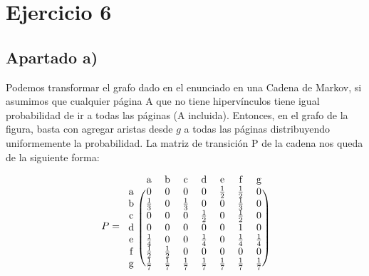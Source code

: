 \documentclass[11pt]{article}
\begin{document}
\section{Ejercicio 6}

\subsection*{Apartado a)}

Podemos transformar el grafo dado en el enunciado en una Cadena de Markov,
si asumimos que cualquier página A que no tiene hipervínculos tiene igual 
probabilidad de ir a todas las páginas (A incluida). Entonces, en el grafo
de la figura, basta con agregar aristas desde $g$ a todas las páginas
distribuyendo uniformemente la probabilidad. 
La matriz de transición P de la cadena nos queda de la siguiente forma:

\begin{equation*}
  P = 
  \begin{blockarray}{cccccccc}
     & \text{a} & \text{b} & \text{c} & \text{d} & \text{e} & \text{f} & \text{g} \\
    \begin{block}{c(ccccccc)}
      \text{a} & 0           & 0           & 0           & 0           & \frac{1}{2} & \frac{1}{2} & 0 \\
      \text{b} & \frac{1}{3} & 0           & \frac{1}{3} & 0           & 0           & \frac{1}{3} & 0 \\
      \text{c} & 0           & 0           & 0           & \frac{1}{2} & 0           & \frac{1}{2} & 0 \\
      \text{d} & 0           & 0           & 0           & 0           & 0           & 1           & 0 \\
      \text{e} & \frac{1}{4} & 0           & 0           & \frac{1}{4} & 0           & \frac{1}{4} & \frac{1}{4} \\
      \text{f} & \frac{1}{2} & \frac{1}{2} & 0           & 0           & 0           & 0           & 0 \\
      \text{g} & \frac{1}{7} & \frac{1}{7} & \frac{1}{7} & \frac{1}{7} & \frac{1}{7} & \frac{1}{7} & \frac{1}{7} \\
    \end{block}
  \end{blockarray}
\end{equation*}

\end{document}
